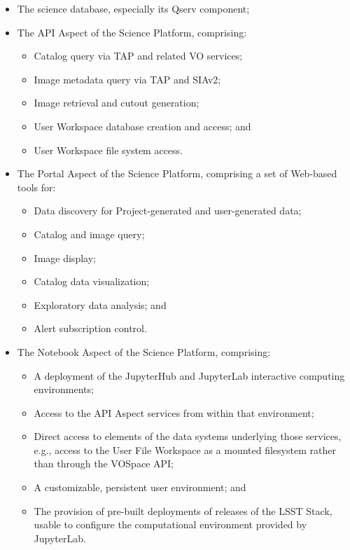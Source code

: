 \documentclass[DM,lsstdraft,STS,toc]{lsstdoc}
\begin{document}
\begin{itemize}

  \item{The science database, especially its Qserv component;}
  \item{The API Aspect of the Science Platform, comprising:

    \begin{itemize}
      \item{Catalog query via TAP and related VO services;}
      \item{Image metadata query via TAP and SIAv2;}
      \item{Image retrieval and cutout generation;}
      \item{User Workspace database creation and access; and}
      \item{User Workspace file system access.}
    \end{itemize}
  }

  \item{The Portal Aspect of the Science Platform, comprising a set of Web-based tools for:

    \begin{itemize}
      \item{Data discovery for Project-generated and user-generated data;}
      \item{Catalog and image query;}
      \item{Image display;}
      \item{Catalog data visualization;}
      \item{Exploratory data analysis; and}
      \item{Alert subscription control.}
    \end{itemize}
  }

  \item{The Notebook Aspect of the Science Platform, comprising:

    \begin{itemize}
      \item{A deployment of the JupyterHub and JupyterLab interactive computing environments;}
      \item{Access to the API Aspect services from within that environment;}
      \item{Direct access to elements of the data systems underlying those services, e.g., access to the User File Workspace as a mounted filesystem rather than through the VOSpace API;}
      \item{A customizable, persistent user environment; and}
      \item{The provision of pre-built deployments of releases of the LSST Stack, usable to configure the computational environment provided by JupyterLab.}
    \end{itemize}

  }

\end{itemize}
\end{document}
